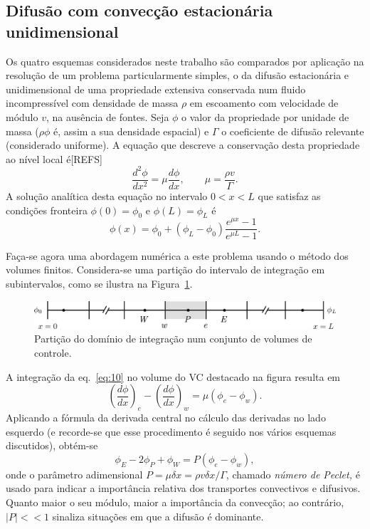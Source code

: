 \documentclass[11pt,twoside]{article}
\begin{document}
{\subsection{Difusão com convecção estacionária unidimensional}
Os quatro esquemas considerados neste trabalho são comparados por aplicação na
resolução de um problema particularmente simples, o da difusão estacionária e
unidimensional de uma propriedade extensiva conservada num fluido incompressível
com densidade de massa $\rho$ em escoamento com velocidade de módulo $v$, na
ausência de fontes. Seja $\phi$ o valor da propriedade por unidade de massa
($\rho\phi$ é, assim a sua densidade espacial) e $\Gamma$ o coeficiente de
difusão relevante (considerado uniforme). A equação que descreve a conservação
desta propriedade ao nível local é[REFS]
\begin{equation}
    \frac{d^2\phi}{dx^2}=\mu\frac{d\phi}{dx}, \qquad \mu=\frac{\rho v}{\Gamma}.
    \label{eq:10}
\end{equation}
A solução analítica desta equação no intervalo $0<x<L$ que satisfaz as condições
fronteira $\phi(0)=\phi_0$ e $\phi(L)=\phi_L$ é
\begin{equation}
    \phi(x) = \phi_0 + (\phi_L-\phi_0)\frac{e^{\mu x}-1}{e^{\mu L}-1}.\label{eq:15}
\end{equation}

Faça-se agora uma abordagem numérica a este problema usando o método dos
volumes finitos. Considera-se uma partição do intervalo de integração em
subintervalos, como se ilustra na Figura~\ref{fig:10}.
\begin{figure}[!h]
\centering
\includegraphics[scale=0.95]{figs/f10.png}
\caption{Partição do domínio de integração num conjunto de volumes de
controle.\label{fig:10}}
\end{figure}
A integração da eq.~\eqref{eq:10} no volume do VC destacado na figura resulta em
\begin{equation}
    \left(\frac{d\phi}{dx}\right)_e- \left(\frac{d\phi}{dx}\right)_w =
    \mu(\phi_e-\phi_w).
\end{equation}
Aplicando a fórmula da derivada central no cálculo das derivadas no lado
esquerdo (e recorde-se que esse procedimento é seguido nos vários esquemas
discutidos), obtém-se
\begin{equation}
    \phi_E-2\phi_P+\phi_W=P(\phi_e-\phi_w),\label{eq:20}
\end{equation}
onde o parâmetro adimensional $P=\mu\delta x=\rho v\delta x/\Gamma$, chamado
\emph{número de Peclet,} é usado para indicar a importância relativa dos
transportes convectivos e difusivos. Quanto maior o seu módulo, maior a
importância da convecção; ao contrário, $|P|<<1$ sinaliza situações em que a
difusão é dominante.

}
\end{document}
